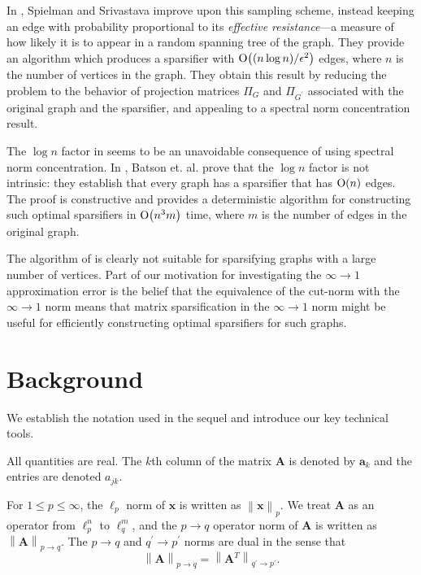 \documentclass[11pt,letterpaper,twoside,reqno]{amsart}
\newcommand{\mat}[1]{\ensuremath{\bm{#1}}}
\newcommand{\norm}[1]{\ensuremath{\left\|#1\right\|}}
\newcommand{\pnorm}[1]{\ensuremath{\left\|#1\right\|_p}}
\newcommand{\infone}{\ensuremath{\infty\!\rightarrow\!\!1}}
\newcommand{\asymO}[1]{\ensuremath{\mathop{\text{\rm O}}\!\left(#1\right)}}
\begin{document}
In \cite{SS08}, Spielman and Srivastava improve upon this sampling scheme, instead keeping an edge with probability proportional to its \emph{effective resistance}---a measure of how likely it is to appear in a random spanning tree of the graph. They provide an algorithm which produces a sparsifier with $\asymO{(n\log n)/\epsilon^{2}}$ edges, where $n$ is the number of vertices in the graph. They obtain this result by reducing the problem to the behavior of projection matrices $\Pi_{G}$ and $\Pi_{G^{\prime}}$ associated with the original graph and the sparsifier, and appealing to a spectral norm concentration result.

The $\log n$ factor in \cite{SS08} seems to be an unavoidable consequence of using spectral norm concentration. In \cite{BSS08}, Batson et. al. prove that the $\log n$ factor is not intrinsic: they establish that every graph has a sparsifier that has $\asymO{n}$ edges. The proof is constructive and provides a deterministic algorithm for constructing such optimal sparsifiers in $\asymO{n^3m}$ time, where $m$ is the number of edges in the original graph.

The algorithm of \cite{BSS08} is clearly not suitable for sparsifying graphs with a large number of vertices. Part of our motivation for investigating the $\infone$ approximation error is the belief that the equivalence of the cut-norm with the $\infone$ norm means that matrix sparsification in the $\infone$ norm might be useful for efficiently constructing optimal sparsifiers for such graphs.

\section{Background}
\label{sec:background} 

We establish the notation used in the sequel and introduce our key technical tools.

All quantities are real. The $k$th column of the matrix $\mat{A}$ is denoted by $\mat{a}_{k}$ and the entries are denoted $a_{jk}.$

For $1\leq p\leq\infty$, the $\ell_p$ norm of $\mat{x}$ is written as $\pnorm{\mat{x}}$. We treat $\mat{A}$ as an operator from $\ell_{p}^{n}$ to $\ell_{q}^{m}$, and the $p\rightarrow q$ operator norm of $\mat{A}$ is written as $\norm{\mat{A}}_{p\rightarrow q}$. The $p\rightarrow q$ and $q^{\prime} \rightarrow p^{\prime}$ norms are dual in the sense that 
\[
\norm{\mat{A}}_{p\rightarrow q}=\norm{\mat{A}^{T}}_{q^{\prime}\rightarrow p^{\prime}}.
\]
\end{document}
